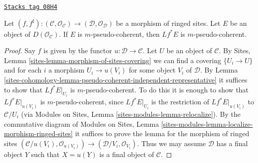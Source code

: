 \begin{lemma}
\label{sites-cohomology-lemma-pseudo-coherent-pullback}
\href{https://stacks.math.columbia.edu/tag/08H4}{\texttt{Stacks tag 08H4}}

Let $(f, f^\sharp) : (\mathcal{C}, \mathcal{O}_\mathcal{C}) \to
(\mathcal{D}, \mathcal{O}_\mathcal{D})$
be a morphism of ringed sites. Let $E$ be an object of
$D(\mathcal{O}_\mathcal{C})$. If $E$ is $m$-pseudo-coherent,
then $Lf^*E$ is $m$-pseudo-coherent.
\end{lemma}

\begin{proof}
Say $f$ is given by the functor $u : \mathcal{D} \to \mathcal{C}$.
Let $U$ be an object of $\mathcal{C}$. By
Sites, Lemma \ref{sites-lemma-morphism-of-sites-covering}
we can find a covering $\{U_i \to U\}$ and for each $i$ a morphism
$U_i \to u(V_i)$ for some object $V_i$ of $\mathcal{D}$.
By Lemma \ref{sites-cohomology-lemma-pseudo-coherent-independent-representative}
it suffices to show that $Lf^*E|_{U_i}$ is $m$-pseudo-coherent.
To do this it is enough to show that $Lf^*E|_{u(V_i)}$ is
$m$-pseudo-coherent, since $Lf^*E|_{U_i}$ is the restriction
of $Lf^*E|_{u(V_i)}$ to $\mathcal{C}/U_i$ (via
Modules on Sites, Lemma
\ref{sites-modules-lemma-relocalize}).
By the commutative diagram of
Modules on Sites, Lemma
\ref{sites-modules-lemma-localize-morphism-ringed-sites}
it suffices to prove the lemma for the morphism of ringed
sites $(\mathcal{C}/u(V_i), \mathcal{O}_{u(V_i)}) \to
(\mathcal{D}/V_i, \mathcal{O}_{V_i})$.
Thus we may assume $\mathcal{D}$ has a final object $Y$ such that
$X = u(Y)$ is a final object of $\mathcal{C}$.


\end{proof}
